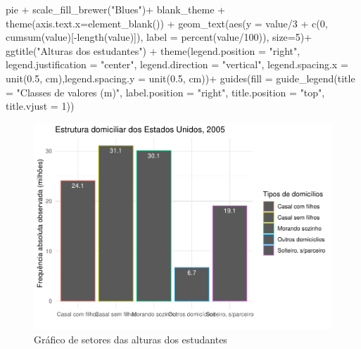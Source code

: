 \documentclass[
]{book}
\newenvironment{Shaded}{\begin{snugshade}}{\end{snugshade}}
\newcommand{\AttributeTok}[1]{\textcolor[rgb]{0.77,0.63,0.00}{#1}}
\newcommand{\DecValTok}[1]{\textcolor[rgb]{0.00,0.00,0.81}{#1}}
\newcommand{\FloatTok}[1]{\textcolor[rgb]{0.00,0.00,0.81}{#1}}
\newcommand{\FunctionTok}[1]{\textcolor[rgb]{0.00,0.00,0.00}{#1}}
\newcommand{\NormalTok}[1]{#1}
\newcommand{\SpecialCharTok}[1]{\textcolor[rgb]{0.00,0.00,0.00}{#1}}
\newcommand{\StringTok}[1]{\textcolor[rgb]{0.31,0.60,0.02}{#1}}
\begin{document}
\begin{Shaded}
\begin{Highlighting}[]
\NormalTok{pie }\SpecialCharTok{+} 
  \FunctionTok{scale\_fill\_brewer}\NormalTok{(}\StringTok{"Blues"}\NormalTok{)}\SpecialCharTok{+}
\NormalTok{  blank\_theme }\SpecialCharTok{+}
  \FunctionTok{theme}\NormalTok{(}\AttributeTok{axis.text.x=}\FunctionTok{element\_blank}\NormalTok{()) }\SpecialCharTok{+}
  \FunctionTok{geom\_text}\NormalTok{(}\FunctionTok{aes}\NormalTok{(}\AttributeTok{y =}\NormalTok{ value}\SpecialCharTok{/}\DecValTok{3} \SpecialCharTok{+} \FunctionTok{c}\NormalTok{(}\DecValTok{0}\NormalTok{, }\FunctionTok{cumsum}\NormalTok{(value)[}\SpecialCharTok{{-}}\FunctionTok{length}\NormalTok{(value)]), }
                \AttributeTok{label =} \FunctionTok{percent}\NormalTok{(value}\SpecialCharTok{/}\DecValTok{100}\NormalTok{)), }\AttributeTok{size=}\DecValTok{5}\NormalTok{)}\SpecialCharTok{+}
  \FunctionTok{ggtitle}\NormalTok{(}\StringTok{"Alturas dos estudantes"}\NormalTok{) }\SpecialCharTok{+}
  \FunctionTok{theme}\NormalTok{(}\AttributeTok{legend.position =} \StringTok{"right"}\NormalTok{, }\AttributeTok{legend.justification =} \StringTok{"center"}\NormalTok{, }\AttributeTok{legend.direction =} \StringTok{"vertical"}\NormalTok{,}
        \AttributeTok{legend.spacing.x =} \FunctionTok{unit}\NormalTok{(}\FloatTok{0.5}\NormalTok{, }\StringTok{\textquotesingle{}cm\textquotesingle{}}\NormalTok{),}\AttributeTok{legend.spacing.y =} \FunctionTok{unit}\NormalTok{(}\FloatTok{0.5}\NormalTok{, }\StringTok{\textquotesingle{}cm\textquotesingle{}}\NormalTok{))}\SpecialCharTok{+}
  \FunctionTok{guides}\NormalTok{(}\AttributeTok{fill =} \FunctionTok{guide\_legend}\NormalTok{(}\AttributeTok{title =} \StringTok{"Classes de valores (m)"}\NormalTok{,}
                             \AttributeTok{label.position =} \StringTok{"right"}\NormalTok{,}
                             \AttributeTok{title.position =} \StringTok{"top"}\NormalTok{, }\AttributeTok{title.vjust =} \DecValTok{1}\NormalTok{)) }
\end{Highlighting}
\end{Shaded}

\begin{figure}
\centering
\includegraphics{apostila_files/figure-latex/unnamed-chunk-53-1.pdf}
\caption{\label{fig:unnamed-chunk-53}Gráfico de setores das alturas dos estudantes}
\end{figure}
\end{document}
